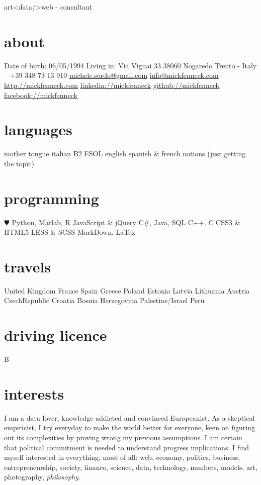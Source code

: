 \documentclass[]{friggeri-cv}
\begin{document}
       {art<data/>web - consultant}


\begin{aside}
  \section{about}
    Date of birth:
    06/05/1994
    Living in:
    Via Vignai 33
    38060 Nogaredo
    Trento - Italy
    ~
    +39 348 73 13 910
    \href{mailto:michele.sordo@gmail.com}{michele.sordo@gmail.com}
    \href{mailto:info@mickfenneck.com}{info@mickfenneck.com}
    \href{http://mickfenneck.com}{http://mickfenneck.com}
    \href{http://linkedin.com/in/mickfenneck}{linkedin://mickfenneck}
    \href{http://github.com/mickfenneck}{github://mickfenneck}
    \href{http://facebook.com/mickfenneck}{facebook://mickfenneck}
  \section{languages}
    mother tongue italian
    B2 ESOL english
    spanish \& french notions
    (just getting the topic)
  \section{programming}
    {\color{red} $\varheartsuit$} Python,
    Matlab, R
    JavaScript \& jQuery
    C\#, Java, SQL
    C++, C
    CSS3 \& HTML5
    LESS \& SCSS
    MarkDown, LaTex
\section{travels}
    United Kingdom
    France
    Spain
    Greece
    Poland
    Estonia
    Latvia
    Lithuania
    Austria
    CzechRepublic
    Croatia
    Bosnia Herzegovina
    Palestine/Israel
    Peru
\section{driving licence}
    B
\end{aside}






\section{interests}
I am a data lover, knowledge addicted and convinced Europeanist. As a skeptical empiricist, I try everyday to make the world better for everyone, keen on figuring out its complexities by proving wrong my previous assumptions. I am certain that political commitment is needed to understand progress implications. I find myself interested in everything, most of all: web, economy, politics, business, entrepreneurship, society, finance, science, data, technology, numbers, models, art, photography, \emph{philosophy}.
\end{document}
